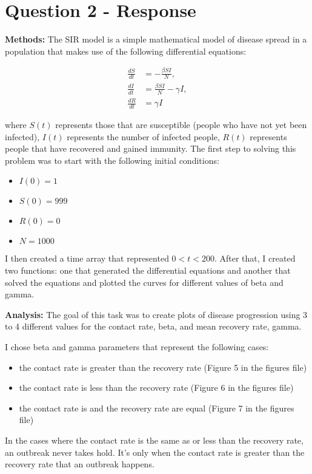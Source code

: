 \documentclass{article}
\begin{document}
\section*{Question 2 - Response}
\textbf{Methods:} The SIR model is a simple mathematical model of disease spread in a population that makes use of the following differential equations:

\begin{align}
    \frac{dS}{dt} &= -\frac{\beta S I}{N},\\
    \frac{dI}{dt} &= \frac{\beta S I}{N} - \gamma I,\\
    \frac{dR}{dt} &= \gamma I
\end{align}

where $S(t)$ represents those that are susceptible (people who have not yet been  infected), $I(t)$ represents the number of infected people, $R(t)$ represents people that have recovered and gained immunity. The first step to solving this problem was to start with the following initial conditions:

\begin{itemize}
    \item $I(0) = 1$ 
    \item $S(0)=999$
    \item $R(0) = 0$
    \item $N = 1000$
\end{itemize}

I then created a time array that represented $0<t<200$. After that, I created two functions: one that generated the differential equations and another that solved the equations and plotted the curves for different values of beta and gamma.

\textbf{Analysis:} The goal of this task was to create plots of disease progression using 3 to 4 different values for the contact rate, beta, and mean recovery rate, gamma. 

I chose beta and gamma parameters that represent the following cases:

\begin{itemize}
    \item the contact rate is greater than the recovery rate (Figure 5 in the figures file)
    \item the contact rate is less than the recovery rate (Figure 6 in the figures file)
    \item the contact rate is and the recovery rate are equal (Figure 7 in the figures file)
\end{itemize}

In the cases where the contact rate is the same as or less than the recovery rate, an outbreak never takes hold. It's only when the contact rate is greater than the recovery rate that an outbreak happens. 
\end{document}
